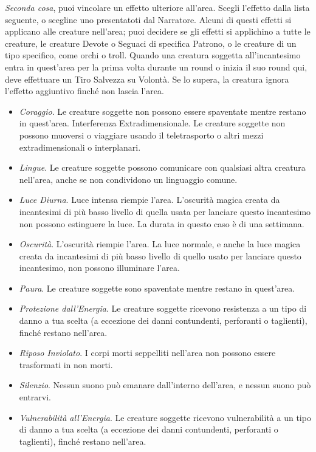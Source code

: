 \begin{multicols}{2}
\emph{Seconda cosa}, puoi vincolare un effetto ulteriore all'area. Scegli l'effetto dalla lista seguente, o scegline uno presentatoti dal Narratore. Alcuni di questi effetti si applicano alle creature nell'area; puoi decidere se gli effetti si applichino a tutte le creature, le creature Devote o Seguaci di specifica Patrono, o le creature di un tipo specifico, come orchi o troll. Quando una creatura soggetta all'incantesimo entra in quest'area per la prima volta durante un round o inizia il suo round qui, deve effettuare un Tiro Salvezza su Volontà. Se lo supera, la creatura ignora l'effetto aggiuntivo finché non lascia l'area.

\begin{itemize}[leftmargin=*] \setlength{\itemsep}{0pt}
	\item \emph{Coraggio}. Le creature soggette non possono essere spaventate mentre restano in quest'area. Interferenza Extradimensionale. Le creature soggette non possono muoversi o viaggiare usando il teletrasporto o altri mezzi extradimensionali o interplanari.
	\item \emph{Lingue}. Le creature soggette possono comunicare con qualsiasi altra creatura nell'area, anche se non condividono un linguaggio comune.
	\item \emph{Luce Diurna}. Luce intensa riempie l'area. L'oscurità magica creata da incantesimi di più basso livello di quella usata per lanciare questo incantesimo non possono estinguere la luce. La durata in questo caso è di una settimana.
	\item \emph{Oscurità}. L'oscurità riempie l'area. La luce normale, e anche la luce magica creata da incantesimi di più basso livello di quello usato per lanciare questo incantesimo, non possono illuminare l'area.
	\item \emph{Paura}. Le creature soggette sono spaventate mentre restano in quest'area.
	\item \emph{Protezione dall'Energia}. Le creature soggette ricevono resistenza a un tipo di danno a tua scelta (a eccezione dei danni contundenti, perforanti o taglienti), finché restano nell'area.
	\item \emph{Riposo Inviolato}. I corpi morti seppelliti nell'area non possono essere trasformati in non morti.
	\item \emph{Silenzio}. Nessun suono può emanare dall'interno dell'area, e nessun suono può entrarvi.
	\item \emph{Vulnerabilità all'Energia}. Le creature soggette ricevono vulnerabilità a un tipo di danno a tua scelta (a eccezione dei danni contundenti, perforanti o taglienti), finché restano nell'area.
\end{itemize}


\end{multicols}
